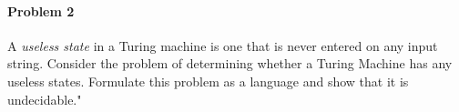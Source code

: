 \documentclass{article}
\begin{document}
    
    \begin{comment}
        $S =$ ``On input $\langle M \rangle$ :
        show that $ALL_{TM}$ is undecidable
        $F =$ "on input $(\langle M \rangle , W)$:
        \begin{enumerate}
        \item Construct M'
        $M' = "On input x$:
        \begin{enumerate}[1]
        \item if $ W = \epsilon$, Reject
        \item Run M on W.
         If it accepts W, Accept X.
         If it Rejects W, Reject x"
        \end{enumerate}
        \item Output $\langle M' \rangle$"
        \end{enumerate}
        
        If M accepts W:  L(M') = $\Sigma*$
        \\If M Rejects W:  L(M') = $\emptyset$
        \\If M loops on W: L(M') = $\emptyset$
        \\--------------------------------------------------
        Other Strategy, not mapping just reduction
    
    \begin{proof}
    Assume $ALL_{TM}$ is decidable. Let $R$ be a TM that decides $ALL_{TM}$.  Use $R$ to construct TM $S$ that decides $ALL_{TM}$.
    \begin{enumerate}
        \item " On input $\langle M, M' \rangle$:
        \\ $S =$ ``On input $x$:
            \begin{enumerate}[1.]
            \item Accept X"
            \end{enumerate}
        \item Run $EQ_{TM}$ on input $\langle M \rangle and \langle M' \rangle$ 
         If $EQ_{TM}$ accepts, Accept. 
         If $EQ_{TM}$ rejects, Reject."
    \end{enumerate}
     Since $ALL_{TM}$ is reducible to $EQ_{TM}$ and $EQ_{TM}$ is undecidable, $ALL_{TM}$ is undecidable.
    \end{proof}
    \end{comment}
    
    
    

\paragraph{Problem 2} A \textit{useless state} in a Turing machine is one that is never entered on any input string. Consider the problem of determining whether a Turing Machine has any useless states. Formulate this problem as a language and show that it is undecidable."
 
\end{document}
